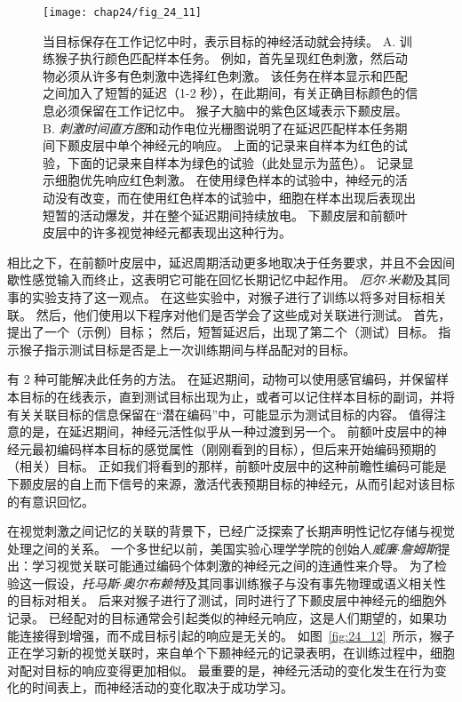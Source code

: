 \begin{figure}[htbp]
	\centering
	\texttt{[image: chap24/fig\_24\_11]}
	\caption{当目标保存在工作记忆中时，表示目标的神经活动就会持续。 
		A. 训练猴子执行颜色匹配样本任务。
		例如，首先呈现红色刺激，然后动物必须从许多有色刺激中选择红色刺激。
		该任务在样本显示和匹配之间加入了短暂的延迟（1-2 秒），在此期间，有关正确目标颜色的信息必须保留在工作记忆中。
		猴子大脑中的紫色区域表示下颞皮层。
		B. \textit{刺激时间直方图}和动作电位光栅图说明了在延迟匹配样本任务期间下颞皮层中单个神经元的响应。
		上面的记录来自样本为红色的试验，下面的记录来自样本为绿色的试验（此处显示为蓝色）。
		记录显示细胞优先响应红色刺激。
		在使用绿色样本的试验中，神经元的活动没有改变，而在使用红色样本的试验中，细胞在样本出现后表现出短暂的活动爆发，并在整个延迟期间持续放电。
		下颞皮层和前额叶皮层中的许多视觉神经元都表现出这种行为。}
	\label{fig:24_11}
\end{figure}


相比之下，在前额叶皮层中，延迟周期活动更多地取决于任务要求，并且不会因间歇性感觉输入而终止，这表明它可能在回忆长期记忆中起作用。
\textit{厄尔$\cdot$米勒}及其同事的实验支持了这一观点\cite{miller1991neural}。
在这些实验中，对猴子进行了训练以将多对目标相关联。
然后，他们使用以下程序对他们是否学会了这些成对关联进行测试。
首先，提出了一个（示例）目标； 然后，短暂延迟后，出现了第二个（测试）目标。
指示猴子指示测试目标是否是上一次训练期间与样品配对的目标。


有 2 种可能解决此任务的方法。
在延迟期间，动物可以使用感官编码，并保留样本目标的在线表示，直到测试目标出现为止，或者可以记住样本目标的副词，并将有关关联目标的信息保留在“潜在编码”中，可能显示为测试目标的内容。
值得注意的是，在延迟期间，神经元活性似乎从一种过渡到另一个。
前额叶皮层中的神经元最初编码样本目标的感觉属性（刚刚看到的目标），但后来开始编码预期的（相关）目标。
正如我们将看到的那样，前额叶皮层中的这种前瞻性编码可能是下颞皮层的自上而下信号的来源，激活代表预期目标的神经元，从而引起对该目标的有意识回忆。


在视觉刺激之间记忆的关联的背景下，已经广泛探索了长期声明性记忆存储与视觉处理之间的关系。
一个多世纪以前，美国实验心理学学院的创始人\textit{威廉$\cdot$詹姆斯}提出：学习视觉关联可能通过编码个体刺激的神经元之间的连通性来介导。
为了检验这一假设，\textit{托马斯$\cdot$奥尔布赖特}及其同事训练猴子与没有事先物理或语义相关性的目标对相关。
后来对猴子进行了测试，同时进行了下颞皮层中神经元的细胞外记录。
已经配对的目标通常会引起类似的神经元响应，这是人们期望的，如果功能连接得到增强，而不成目标引起的响应是无关的。
如图~\ref{fig:24_12}~所示，猴子正在学习新的视觉关联时，来自单个下颞神经元的记录表明，在训练过程中，细胞对配对目标的响应变得更加相似。
最重要的是，神经元活动的变化发生在行为变化的时间表上，而神经活动的变化取决于成功学习。


